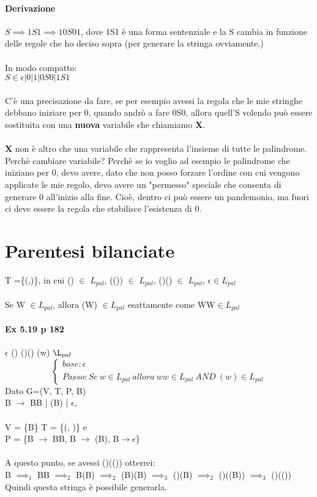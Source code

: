 \documentclass[12pt, a4paper, openany, oneside]{book}
\begin{document}
\paragraph{Derivazione}
$S \implies 1S1 \implies 10S01$, dove 1S1 è una forma sentenziale e la S cambia in
funzione delle regole che ho deciso sopra (per generare la stringa ovviamente.)
\\ \\ In modo compatto: \\
$S \in \epsilon | 0 | 1 | 0S0 | 1S1$
\\ \\
C'è una precisazione da fare, se per esempio avessi la regola che le mie stringhe
debbano iniziare per 0, quando andrò a fare 0S0, allora quell'S volendo può
essere sostituita con una \textbf{nuova} variabile che chiamiamo \textbf{X}. \\ \\
\textbf{X} non è altro che una variabile che rappresenta l'insieme di tutte le
palindrome.
Perchè cambiare variabile? Perchè se io voglio ad esempio le palindrome che 
iniziano per 0, devo avere, dato che non posso forzare l'ordine con cui vengono
applicate le mie regolo, devo avere un "permesso" speciale che consenta di 
generare 0 all'inizio alla fine. Cioè, dentro ci può essere un pandemonio, ma 
fuori ci deve essere la regola che stabilisce l'esistenza di 0.
\section{Parentesi bilanciate}
T =\{(,)\}, in cui () $\in$ $L_{pal}$, (()) $\in$ $L_{pal}$, ()() $\in$ $L_{pal}$,
$\epsilon \in L_{pal}$ \\ \\
Se W $\in L_{pal}$, allora (W) $\in L_{pal}$ esattamente come WW$\in L_{pal}$
\paragraph{Ex 5.19 p 182}
$\epsilon$ ()  ()() (w) $\L_{pal}$
$$\begin{cases}
\underline{base}: \epsilon	\\
\underline{Passo}: Se~w\in L_{pal} ~ allora ~ ww\in L_{pal} 
~AND~ (w)\in L_{pal} 
\end{cases}$$
Dato G=(V, T, P, B) \\
B $\to$ BB | (B) | $\epsilon$, \\ \\
V = \{B\} T = \{(, )\} e \\
P = \{B $\to$ BB, B $\to$ (B), B$\to \epsilon$\} \\ \\
A questo punto, se avessi ()(()) otterrei: \\
B $\implies _{1}$ BB $\implies _{2}$ B(B) $\implies _{2}$ (B)(B) $\implies _{3}$
()(B) $\implies _{2}$ ()((B)) $\implies _{3}$ ()(()) \\
Quindi questa stringa è possibile generarla.
\end{document}
